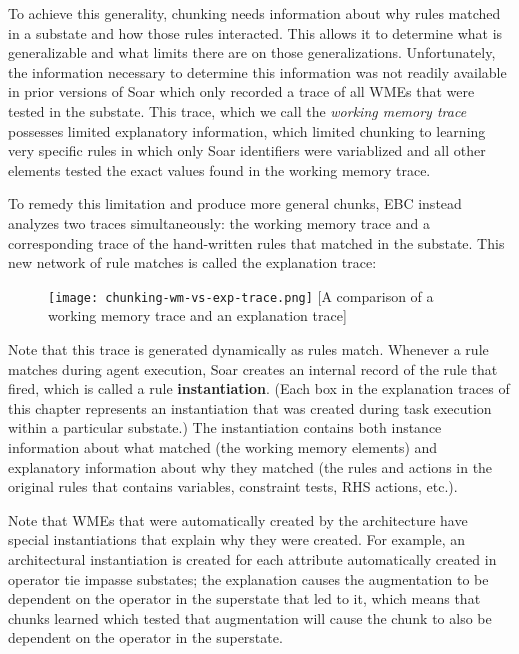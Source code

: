 To achieve this generality, chunking needs information about why rules matched in a substate and how those rules interacted.  This allows it to determine what is generalizable and what limits there are on those generalizations. Unfortunately, the information necessary to determine this information was not readily available in prior versions of Soar which only recorded a trace of all WMEs that were tested in the substate.  This trace, which we call the \textit{working memory trace} possesses limited explanatory information, which limited chunking to learning very specific rules in which only Soar identifiers were variablized and all other elements tested the exact values found in the working memory trace.

To remedy this limitation and produce more general chunks, EBC instead analyzes two traces simultaneously:  the working memory trace and a corresponding trace of the hand-written rules that matched in the substate.  This new network of rule matches is called the explanation trace:

\vspace{18pt}
\begin{figure}[!h]
	\centering
	\texttt{[image: chunking-wm-vs-exp-trace.png]}
	[A comparison of a working memory trace and an explanation trace]
	\label{fig:chunking-wm-vs-exp}
\end{figure}
\vspace{6pt}

Note that this trace is generated dynamically as rules match.  Whenever a rule matches during agent execution, Soar creates an internal record of the rule that fired, which is called a rule \textbf{instantiation}.  (Each box in the explanation traces of this chapter represents an instantiation that was created during task execution within a particular substate.) The instantiation contains both instance information about what matched (the working memory elements) and explanatory information about why they matched (the rules and actions in the original rules that contains variables, constraint tests, RHS actions, etc.).

Note that WMEs that were automatically created by the architecture have special instantiations that explain why they were created.  For example, an architectural instantiation is created for each  attribute automatically created in operator tie impasse substates; the explanation causes the  augmentation to be dependent on the operator in the superstate that led to it, which means that chunks learned which tested that  augmentation will cause the chunk to also be dependent on the operator in the superstate.

